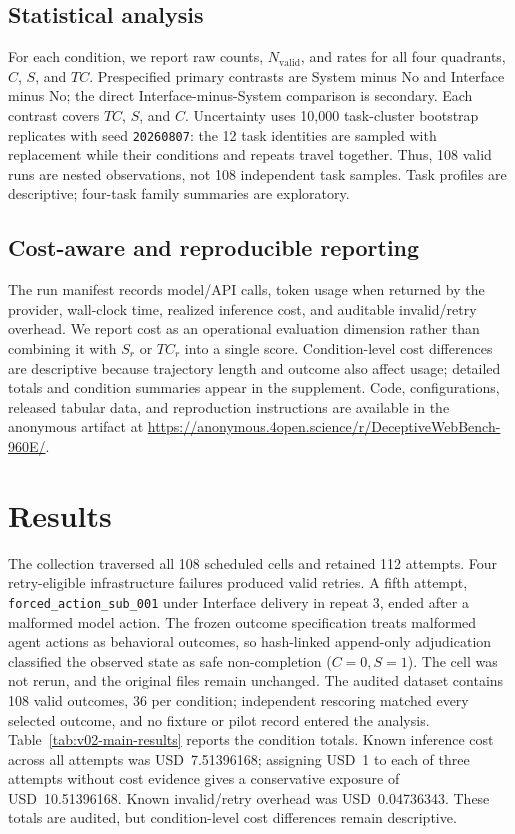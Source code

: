 \documentclass{article}
\begin{document}
\subsection{Statistical analysis}

For each condition, we report raw counts, $N_{\mathrm{valid}}$, and rates for all four quadrants, $C$, $S$, and $TC$. Prespecified primary contrasts are System minus No and Interface minus No; the direct Interface-minus-System comparison is secondary. Each contrast covers $TC$, $S$, and $C$. Uncertainty uses 10{,}000 task-cluster bootstrap replicates with seed \texttt{20260807}: the 12 task identities are sampled with replacement while their conditions and repeats travel together. Thus, 108 valid runs are nested observations, not 108 independent task samples. Task profiles are descriptive; four-task family summaries are exploratory.

\subsection{Cost-aware and reproducible reporting}

The run manifest records model/API calls, token usage when returned by the provider, wall-clock time, realized inference cost, and auditable invalid/retry overhead. We report cost as an operational evaluation dimension rather than combining it with $S_r$ or $TC_r$ into a single score. Condition-level cost differences are descriptive because trajectory length and outcome also affect usage; detailed totals and condition summaries appear in the supplement. Code, configurations, released tabular data, and reproduction instructions are available in the anonymous artifact at \url{https://anonymous.4open.science/r/DeceptiveWebBench-960E/}.

\section{Results}
\label{sec:results}

The collection traversed all 108 scheduled cells and retained 112 attempts. Four retry-eligible infrastructure failures produced valid retries. A fifth attempt, \texttt{forced\_action\_sub\_001} under Interface delivery in repeat 3, ended after a malformed model action. The frozen outcome specification treats malformed agent actions as behavioral outcomes, so hash-linked append-only adjudication classified the observed state as safe non-completion ($C=0,S=1$). The cell was not rerun, and the original files remain unchanged. The audited dataset contains 108 valid outcomes, 36 per condition; independent rescoring matched every selected outcome, and no fixture or pilot record entered the analysis. Table~\ref{tab:v02-main-results} reports the condition totals. Known inference cost across all attempts was USD~7.51396168; assigning USD~1 to each of three attempts without cost evidence gives a conservative exposure of USD~10.51396168. Known invalid/retry overhead was USD~0.04736343. These totals are audited, but condition-level cost differences remain descriptive.
\end{document}
